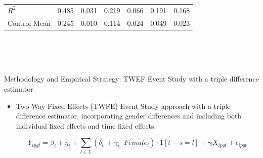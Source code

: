 \documentclass[serif, aspectratio=169]{beamer}
\begin{document}
\begin{frame}
\begin{table}[htbp]
\begin{tabular}{@{}l*{6}{c}@{}}
$\textit{R}^2$&    0.485         &    0.031         &    0.219         &    0.066         &    0.191         &    0.168         \\
Control Mean&    0.245         &    0.010         &    0.114         &    0.024         &    0.049         &    0.023         \\
\bottomrule
\end{tabular}
\\\\
\\


\end{table}

\end{frame}

\begin{frame}{Methodology and Empirical Strategy: TWEF Event Study with a triple difference estimator}
    \begin{itemize}
    \item Two-Way Fixed Effects (TWFE) Event Study approach with a triple difference estimator, incorporating gender differences and including both individual fixed effects and time fixed effects:

\begin{equation}
Y_{ipgt} = \beta_i + \eta_t + \sum_{l \in L} (\delta_l\ + \gamma_l \cdot Female_i) \cdot 1[t-s = l] +  \mathbf \gamma {X}_{ipgt}+\epsilon_{ipgt}
\end{equation}
\end{itemize}

\end{frame}

\end{document}
